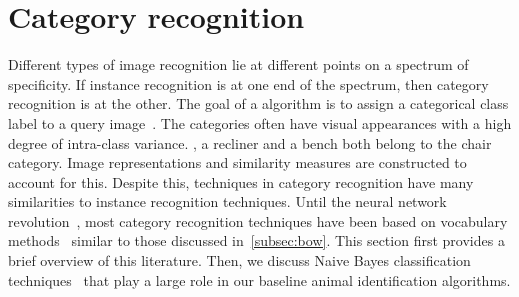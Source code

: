 \section{Category recognition}\label{sec:cr}  

    Different types of image recognition lie at different points on a
      spectrum of specificity.
    If instance recognition is at one end of the spectrum, then
      category recognition is at the other.
    The goal of a  algorithm is to
      assign a categorical class label to a query
      image~\cite{everingham_pascal_2010, everingham_pascal_2015,
      russakovsky_imagenet_2014, deng_imagenet_2009, feifei_oneshot_2006,
      griffin_caltech256_2007}.
    The categories often have visual appearances with a high degree of
      intra-class variance.
    \Eg{}, a recliner and a bench both belong to the chair category.
    Image representations and similarity measures are constructed to
      account for this.
    Despite this, techniques in category recognition have many
      similarities to instance recognition techniques.
    Until the neural network
      revolution~\cite{krizhevsky_imagenet_2012}, most category
      recognition techniques have been based on vocabulary
      methods~\cite{csurka_visual_2004, yang_linear_2009,
      sanchez_compressed_2013, russakovsky_imagenet_2014,
      krizhevsky_imagenet_2012} similar to those discussed
      in~\cref{subsec:bow}.
    This section first provides a brief overview of this literature.
    Then, we discuss Naive Bayes classification
      techniques~\cite{boiman_defense_2008,mccann_local_2012} that play a
      large role in our baseline animal identification algorithms.


